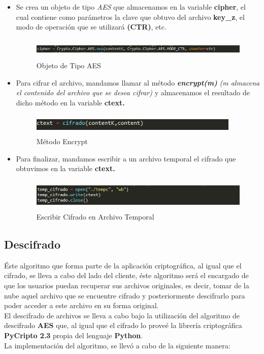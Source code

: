 \begin{itemize}
		\item Se crea un objeto de tipo \textit{AES} que almacenamos en la variable \textbf{cipher}, el cual contiene como parámetros la clave que obtuvo del archivo  \textbf{key\_z}, el modo de operación que se utilizará \textbf{(CTR)}, etc.
			\begin{figure}[H]
			\centering
			\includegraphics[width=15cm, height=1cm]{./images/cifrado/03.jpg}
			\caption{Objeto de Tipo AES}
			\label{fig:6-2-3} 
			\end{figure} 

		\item Para cifrar el archivo, mandamos llamar al método \textbf{\textit{encrypt(m)}} \textit{(m almacena el contenido del archivo que se desea cifrar)} y almacenamos el resultado de dicho método en la variable \textbf{ctext.}
			\begin{figure}[H]
			\centering
			\includegraphics[width=10cm, height=1cm]{./images/cifrado/04.jpg}
			\caption{Método Encrypt}
			\label{fig:6-2-4} 
			\end{figure} 

		\item Para finalizar, mandamos escribir a un archivo temporal el cifrado que obtuvimos en la variable \textbf{ctext.}
			\begin{figure}[H]
			\centering
			\includegraphics[width=13cm, height=1.5cm]{./images/cifrado/05.jpg}
			\caption{Escribir Cifrado en Archivo Temporal}
			\label{fig:6-2-4} 
			\end{figure} 


	\end{itemize}


\subsection{Descifrado}
Éste algoritmo que forma parte de la aplicación criptográfica, al igual que el cifrado, se lleva a cabo del lado del cliente, éste algoritmo será el encargado de que los usuarios puedan recuperar sus archivos originales, es decir, tomar de la nube aquel archivo que se encuentre cifrado y posteriormente descifrarlo para poder acceder a este archivo en su forma original. \\
El descifrado de archivos se lleva a cabo bajo la utilización del algoritmo de descifrado \textbf{AES} que, al igual que el cifrado lo proveé la librería criptográfica \textbf{PyCripto 2.3} propia del lenguaje \textbf{Python}.   \\ 
La implementación del algoritmo, se llevó a cabo de la siguiente manera: 

